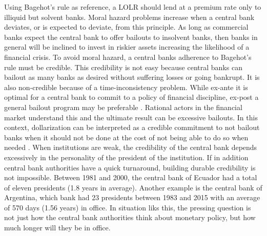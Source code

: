 \documentclass[12pt]{article}
\begin{document}
Using Bagehot's rule as reference, a LOLR should lend at a premium rate only to illiquid but solvent banks. Moral hazard problems increase when a central bank deviates, or is expected to deviate, from this principle. As long as commercial banks expect the central bank to offer bailouts to insolvent banks, then banks in general will be inclined to invest in riskier assets increasing the likelihood of a financial crisis. To avoid moral hazard, a central banks adherence to Bagehot's rule must be credible. This credibility is not easy because central banks can bailout as many banks as desired without suffering losses or going bankrupt. It is also non-credible because of a time-inconsistency problem. While ex-ante it is optimal for a central bank to commit to a policy of financial discipline, ex-post a general bailout program may be preferable \parencite[][p. 469]{Gale2002}. Rational actors in the financial market understand this and the ultimate result can be excessive bailouts. In this context, dollarization can be interpreted as a credible commitment to not bailout banks when it should not be done at the cost of not being able to do so when needed \parencite{Gale2002}. When institutions are weak, the credibility of the central bank depends excessively in the personality of the president of the institution. If in addition central bank authorities have a quick turnaround, building durable credibility is not impossible. Between 1981 and 2000, the central bank of Ecuador had a total of eleven presidents (1.8 years in average). Another example is the central bank of Argentina, which bank had 23 presidents between 1983 and 2015 with an average of 570 days (1.56 years) in office. In situation liks this, the pressing question is not just how the central bank authorities think about monetary policy, but how much longer will they be in office.
\end{document}
